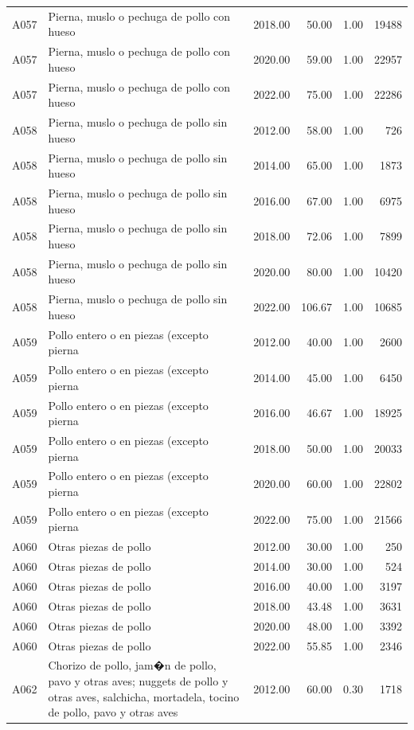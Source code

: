 \begin{table}[ht]
\begin{tabular}{llrrrr}
  A057 & Pierna, muslo o pechuga de pollo con hueso & 2018.00 & 50.00 & 1.00 & 19488 \\ 
  A057 & Pierna, muslo o pechuga de pollo con hueso & 2020.00 & 59.00 & 1.00 & 22957 \\ 
  A057 & Pierna, muslo o pechuga de pollo con hueso & 2022.00 & 75.00 & 1.00 & 22286 \\ 
  A058 & Pierna, muslo o pechuga de pollo sin hueso & 2012.00 & 58.00 & 1.00 & 726 \\ 
  A058 & Pierna, muslo o pechuga de pollo sin hueso & 2014.00 & 65.00 & 1.00 & 1873 \\ 
  A058 & Pierna, muslo o pechuga de pollo sin hueso & 2016.00 & 67.00 & 1.00 & 6975 \\ 
  A058 & Pierna, muslo o pechuga de pollo sin hueso & 2018.00 & 72.06 & 1.00 & 7899 \\ 
  A058 & Pierna, muslo o pechuga de pollo sin hueso & 2020.00 & 80.00 & 1.00 & 10420 \\ 
  A058 & Pierna, muslo o pechuga de pollo sin hueso & 2022.00 & 106.67 & 1.00 & 10685 \\ 
  A059 & Pollo entero o en piezas (excepto pierna & 2012.00 & 40.00 & 1.00 & 2600 \\ 
  A059 & Pollo entero o en piezas (excepto pierna & 2014.00 & 45.00 & 1.00 & 6450 \\ 
  A059 & Pollo entero o en piezas (excepto pierna & 2016.00 & 46.67 & 1.00 & 18925 \\ 
  A059 & Pollo entero o en piezas (excepto pierna & 2018.00 & 50.00 & 1.00 & 20033 \\ 
  A059 & Pollo entero o en piezas (excepto pierna & 2020.00 & 60.00 & 1.00 & 22802 \\ 
  A059 & Pollo entero o en piezas (excepto pierna & 2022.00 & 75.00 & 1.00 & 21566 \\ 
  A060 & Otras piezas de pollo & 2012.00 & 30.00 & 1.00 & 250 \\ 
  A060 & Otras piezas de pollo & 2014.00 & 30.00 & 1.00 & 524 \\ 
  A060 & Otras piezas de pollo & 2016.00 & 40.00 & 1.00 & 3197 \\ 
  A060 & Otras piezas de pollo & 2018.00 & 43.48 & 1.00 & 3631 \\ 
  A060 & Otras piezas de pollo & 2020.00 & 48.00 & 1.00 & 3392 \\ 
  A060 & Otras piezas de pollo & 2022.00 & 55.85 & 1.00 & 2346 \\ 
  A062 & Chorizo de pollo, jam�n de pollo, pavo y otras aves; nuggets de pollo y otras aves, salchicha, mortadela, tocino de pollo, pavo y otras aves & 2012.00 & 60.00 & 0.30 & 1718 \\ 

\end{tabular}
\end{table}
